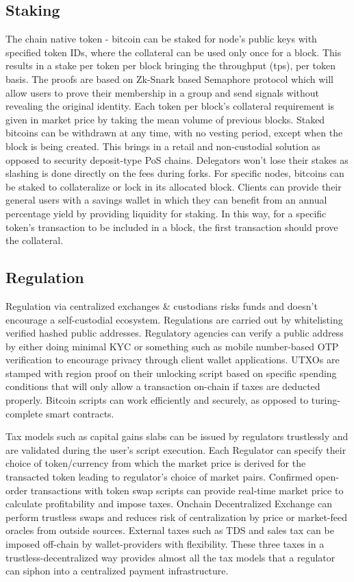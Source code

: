 \documentclass[a4paper,10pt]{article}
\begin{document}
\subsection{Staking}
The chain native token - bitcoin can be staked for node's public keys with specified token IDs, where the collateral can be used only once for a block. This results in a stake per token per block bringing the throughput (tps), per token basis. The proofs are based on Zk-Snark based Semaphore protocol \cite{semaphore} which will allow users to prove their membership in a group and send signals without revealing the original identity. Each token per block's collateral requirement is given in market price by taking the mean volume of previous blocks. Staked bitcoins can be withdrawn at any time, with no vesting period, except when the block is being created. This brings in a retail and non-custodial solution as opposed to security deposit-type PoS chains. Delegators won't lose their stakes as slashing is done directly on the fees during forks. For specific nodes, bitcoins can be staked to collateralize or lock in its allocated block. Clients can provide their general users with a savings wallet in which they can benefit from an annual percentage yield by providing liquidity for staking. In this way, for a specific token's transaction to be included in a block, the first transaction should prove the collateral.

\subsection{Regulation}
Regulation via centralized exchanges \& custodians risks funds and doesn't encourage a self-custodial ecosystem. Regulations are carried out by whitelisting verified hashed public addresses. Regulatory agencies can verify a public address by either doing minimal KYC or something such as mobile number-based OTP verification to encourage privacy through client wallet applications. UTXOs are stamped with region proof on their unlocking script based on specific spending conditions that will only allow a transaction on-chain if taxes are deducted properly. Bitcoin scripts can work efficiently and securely, as opposed to turing-complete smart contracts. 

Tax models such as capital gains slabs can be issued by regulators trustlessly and are validated during the user's script execution. Each Regulator can specify their choice of token/currency from which the market price is derived for the transacted token leading to regulator's choice of market pairs. Confirmed open-order transactions with token swap scripts can provide real-time market price to calculate profitability and impose taxes. Onchain Decentralized Exchange can perform trustless swaps and reduces risk of centralization by price or market-feed oracles from outside sources. External taxes such as TDS and sales tax can be imposed off-chain by wallet-providers with flexibility. These three taxes in a trustless-decentralized way provides almost all the tax models that a regulator can siphon into a centralized payment infrastructure.
\end{document}
